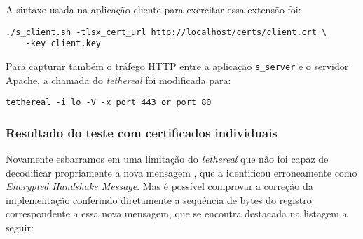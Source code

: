 A sintaxe usada na aplicação cliente para exercitar essa extensão foi:

\begin{lstlisting}[caption={Chamada da \texttt{s\_client.sh} para teste da extensão \acs{CCU}}]
./s_client.sh -tlsx_cert_url http://localhost/certs/client.crt \
    -key client.key
\end{lstlisting}

Para capturar também o tráfego \acs{HTTP} entre a aplicação \verb|s_server| e o servidor
Apache, a chamada do \emph{tethereal} foi modificada para:

\begin{lstlisting}[caption={Chamada do \texttt{tethereal} para capturar tráfegos TLS e HTTP}]
tethereal -i lo -V -x port 443 or port 80
\end{lstlisting}

\subsubsection{Resultado do teste com certificados individuais}

Novamente esbarramos em uma limitação do \emph{tethereal} que não foi capaz de
decodificar propriamente a nova mensagem \tlsHsCu, que a identificou
erroneamente como \emph{Encrypted Handshake Message}. Mas é possível comprovar a
correção da implementação conferindo diretamente a seqüência de bytes do
registro correspondente a essa nova mensagem, que se encontra destacada na
listagem a seguir:

